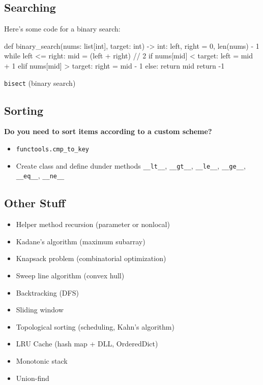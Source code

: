 \documentclass[12pt]{article}
\begin{document}
\subsection*{Searching}

\begin{adjustwidth}{2em}{0pt}
Here's some code for a binary search:
\begin{python}
def binary_search(nums: list[int], target: int) -> int:
    left, right = 0, len(nums) - 1
    while left <= right:
        mid = (left + right) // 2
        if nums[mid] < target:
            left = mid + 1
        elif nums[mid] > target:
            right = mid - 1
        else:
            return mid
    return -1
\end{python}

\texttt{bisect} (binary search)
\end{adjustwidth}

\subsection*{Sorting}

\begin{adjustwidth}{2em}{0pt}
\textbf{Do you need to sort items according to a custom scheme?}
\begin{itemize}
  \item \texttt{functools.cmp\_to\_key} 
  \item Create class and define dunder methods \texttt{\_\_lt\_\_}, \texttt{\_\_gt\_\_}, \texttt{\_\_le\_\_}, \texttt{\_\_ge\_\_}, \texttt{\_\_eq\_\_}, \texttt{\_\_ne\_\_}
\end{itemize}
\end{adjustwidth}

\subsection*{Other Stuff}

\begin{itemize}
  \item Helper method recursion (parameter or nonlocal)
  \item Kadane's algorithm (maximum subarray)
  \item Knapsack problem (combinatorial optimization)
  \item Sweep line algorithm (convex hull)
  \item Backtracking (DFS)
  \item Sliding window
  \item Topological sorting (scheduling, Kahn's algorithm)
  \item LRU Cache (hash map + DLL, OrderedDict)
  \item Monotonic stack
  \item Union-find
\end{itemize}
\end{document}

